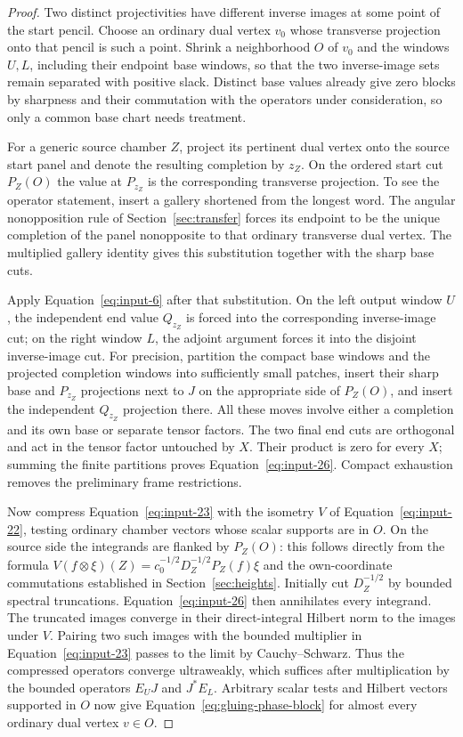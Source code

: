 \begin{proof}
Two distinct projectivities have different inverse images at some
point of the start pencil.  Choose an ordinary dual vertex $v_0$
whose transverse projection onto that pencil is such a point.
Shrink a neighborhood $O$ of $v_0$ and the windows $U,L$, including
their endpoint base windows, so that the two inverse-image sets
remain separated with positive slack.  Distinct base values
already give zero blocks by sharpness and their commutation with
the operators under consideration, so only a common base chart
needs treatment.

For a generic source chamber $Z$, project its pertinent dual vertex
onto the source start panel and denote the resulting completion
by $z_Z$.  On the ordered start cut $P_Z(O)$ the value at
$P_{z_Z}$ is the corresponding transverse projection.  To see the
operator statement, insert a gallery shortened from the longest
word.  The angular nonopposition rule of Section~\ref{sec:transfer}
forces its endpoint to be the unique completion of the panel
nonopposite to that ordinary transverse dual vertex.  The
multiplied gallery identity gives this substitution together with
the sharp base cuts.

Apply Equation~\eqref{eq:input-6} after that substitution.  On the
left output window $U$, the independent end value $Q_{z_Z}$ is
forced into the corresponding inverse-image cut; on the right
window $L$, the adjoint argument forces it into the disjoint
inverse-image cut.  For precision, partition the compact base
windows and the projected completion windows into sufficiently
small patches, insert their sharp base and $P_{z_Z}$ projections
next to $J$ on the appropriate side of $P_Z(O)$, and insert the
independent $Q_{z_Z}$ projection there.  All these moves involve
either a completion and its own base or separate tensor factors.
The two final end cuts are orthogonal and act in the tensor factor
untouched by $X$.  Their product is zero for every $X$; summing
the finite partitions proves Equation~\eqref{eq:input-26}.
Compact exhaustion removes the preliminary frame restrictions.

Now compress Equation~\eqref{eq:input-23} with the isometry $V$
of Equation~\eqref{eq:input-22}, testing ordinary chamber vectors
whose scalar supports are in $O$.  On the source side the
integrands are flanked by $P_Z(O)$: this follows directly from
the formula $V(f\otimes\xi)(Z)=
c_0^{-1/2}D_Z^{-1/2}P_Z(f)\xi$ and the own-coordinate
commutations established in Section~\ref{sec:heights}.
Initially cut $D_Z^{-1/2}$ by bounded spectral truncations.
Equation~\eqref{eq:input-26} then annihilates every integrand.
The truncated images converge in their direct-integral Hilbert
norm to the images under $V$.  Pairing two such images with the
bounded multiplier in Equation~\eqref{eq:input-23} passes to the
limit by Cauchy--Schwarz.  Thus the compressed operators converge
ultraweakly, which suffices after multiplication by the bounded
operators $E_UJ$ and $J^*E_L$.  Arbitrary scalar tests and Hilbert
vectors supported in $O$ now give
Equation~\eqref{eq:gluing-phase-block} for almost every ordinary
dual vertex $v\in O$.


\end{proof}
